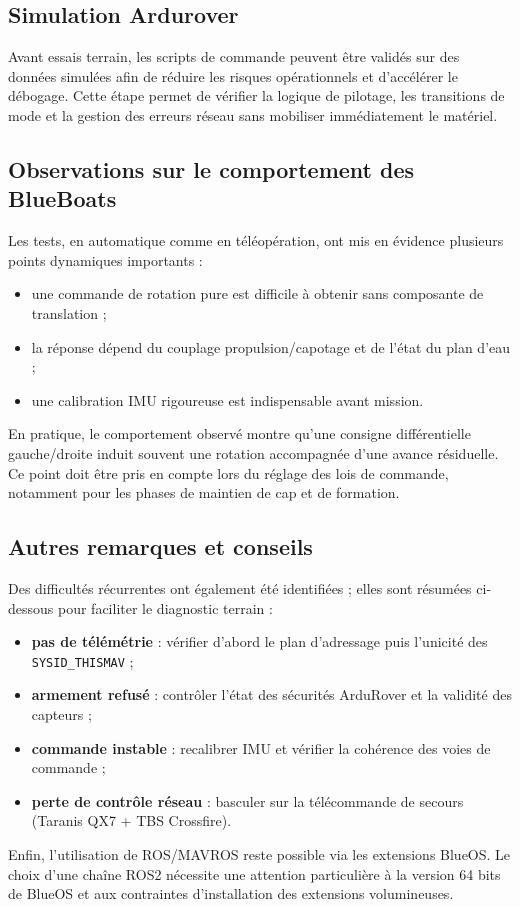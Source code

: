 \subsection{Simulation Ardurover}

Avant essais terrain, les scripts de commande peuvent être validés sur des données simulées afin de réduire les risques opérationnels et d'accélérer le débogage. Cette étape permet de vérifier la logique de pilotage, les transitions de mode et la gestion des erreurs réseau sans mobiliser immédiatement le matériel.

\subsection{Observations sur le comportement des BlueBoats}

Les tests, en automatique comme en téléopération, ont mis en évidence plusieurs points dynamiques importants :
\begin{itemize}
    \item une commande de rotation pure est difficile à obtenir sans composante de translation ;
    \item la réponse dépend du couplage propulsion/capotage et de l'état du plan d'eau ;
    \item une calibration IMU rigoureuse est indispensable avant mission.
\end{itemize}

En pratique, le comportement observé montre qu'une consigne différentielle gauche/droite induit souvent une rotation accompagnée d'une avance résiduelle. Ce point doit être pris en compte lors du réglage des lois de commande, notamment pour les phases de maintien de cap et de formation.

\subsection{Autres remarques et conseils}

Des difficultés récurrentes ont également été identifiées ; elles sont résumées ci-dessous pour faciliter le diagnostic terrain :
\begin{itemize}
    \item \textbf{pas de télémétrie} : vérifier d'abord le plan d'adressage puis l'unicité des \texttt{SYSID\_THISMAV} ;
    \item \textbf{armement refusé} : contrôler l'état des sécurités ArduRover et la validité des capteurs ;
    \item \textbf{commande instable} : recalibrer IMU et vérifier la cohérence des voies de commande ;
    \item \textbf{perte de contrôle réseau} : basculer sur la télécommande de secours (Taranis QX7 + TBS Crossfire).
\end{itemize}

Enfin, l'utilisation de ROS/MAVROS reste possible via les extensions BlueOS. Le choix d'une chaîne ROS2 nécessite une attention particulière à la version 64 bits de BlueOS et aux contraintes d'installation des extensions volumineuses.
